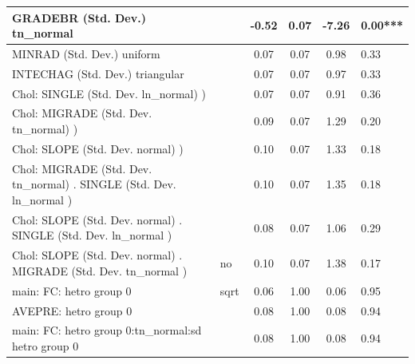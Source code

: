 \begin{table}
\begin{center}
\begin{tabular}{|l|l|c|c|c|l|}
			\hline
			GRADEBR (Std. Dev.) tn_normal &  & -0.52 & 0.07 & -7.26 & 0.00*** \\
			\hline
			MINRAD (Std. Dev.) uniform &  & 0.07 & 0.07 & 0.98 & 0.33 \\
			\hline
			INTECHAG (Std. Dev.) triangular &  & 0.07 & 0.07 & 0.97 & 0.33 \\
			\hline
			 Chol: SINGLE (Std. Dev. ln_normal) ) &  & 0.07 & 0.07 & 0.91 & 0.36 \\
			\hline
			 Chol: MIGRADE (Std. Dev. tn_normal) ) &  & 0.09 & 0.07 & 1.29 & 0.20 \\
			\hline
			 Chol: SLOPE (Std. Dev. normal) ) &  & 0.10 & 0.07 & 1.33 & 0.18 \\
			\hline
			 Chol: MIGRADE (Std. Dev. tn_normal) . SINGLE (Std. Dev.   ln_normal ) &  & 0.10 & 0.07 & 1.35 & 0.18 \\
			\hline
			 Chol: SLOPE (Std. Dev. normal) . SINGLE (Std. Dev.   ln_normal ) &  & 0.08 & 0.07 & 1.06 & 0.29 \\
			\hline
			 Chol: SLOPE (Std. Dev. normal) . MIGRADE (Std. Dev.   tn_normal ) & no & 0.10 & 0.07 & 1.38 & 0.17 \\
			\hline
			main: FC: hetro group 0 & sqrt & 0.06 & 1.00 & 0.06 & 0.95 \\
			\hline
			AVEPRE: hetro group 0 &  & 0.08 & 1.00 & 0.08 & 0.94 \\
			\hline
			main: FC: hetro group 0:tn_normal:sd  hetro group 0 &  & 0.08 & 1.00 & 0.08 & 0.94 \\
			\hline
		\end{tabular}
	\end{center}
\end{table}